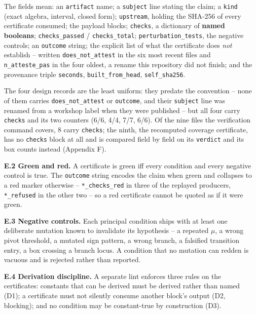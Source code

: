 The fields mean: an \texttt{artifact} name; a \texttt{subject} line stating the claim; a \texttt{kind} (exact algebra, interval, closed form); \texttt{upstream}, holding the SHA-256 of every certificate consumed; the payload blocks; \texttt{checks}, a dictionary of \textbf{named booleans}; \texttt{checks\_\allowbreak{}passed} / \texttt{checks\_\allowbreak{}total}; \texttt{perturbation\_\allowbreak{}tests}, the negative controls; an \texttt{outcome} string; the explicit list of what the certificate does \emph{not} establish -- written \texttt{does\_\allowbreak{}not\_\allowbreak{}attest} in the six most recent files and \texttt{n\_\allowbreak{}atteste\_\allowbreak{}pas} in the four oldest, a rename this repository did not finish; and the provenance triple \texttt{seconds}, \texttt{built\_\allowbreak{}from\_\allowbreak{}head}, \texttt{self\_\allowbreak{}sha256}.

The four design records are the least uniform: they predate the convention -- none of them carries \texttt{does\_\allowbreak{}not\_\allowbreak{}attest} or \texttt{outcome}, and their \texttt{subject} line was renamed from a workshop label when they were published -- but all four carry \texttt{checks} and its two counters (6/6, 4/4, 7/7, 6/6). Of the nine files the verification command covers, 8 carry \texttt{checks}; the ninth, the recomputed coverage certificate, has no \texttt{checks} block at all and is compared field by field on its \texttt{verdict} and its box counts instead (Appendix F).

\textbf{E.2 Green and red.} A certificate is green iff every condition and every negative control is true. The \texttt{outcome} string encodes the claim when green and collapses to a red marker otherwise -- \texttt{*\_\allowbreak{}checks\_\allowbreak{}red} in three of the replayed producers, \texttt{*\_\allowbreak{}refused} in the other two -- so a red certificate cannot be quoted as if it were green.

\textbf{E.3 Negative controls.} Each principal condition ships with at least one deliberate mutation known to invalidate its hypothesis -- a repeated \(\mu\), a wrong pivot threshold, a mutated sign pattern, a wrong branch, a falsified transition entry, a box crossing a branch locus. A condition that no mutation can redden is vacuous and is rejected rather than reported.

\textbf{E.4 Derivation discipline.} A separate lint enforces three rules on the certificates: constants that can be derived must be derived rather than named (D1); a certificate must not silently consume another block's output (D2, blocking); and no condition may be constant-true by construction (D3).

